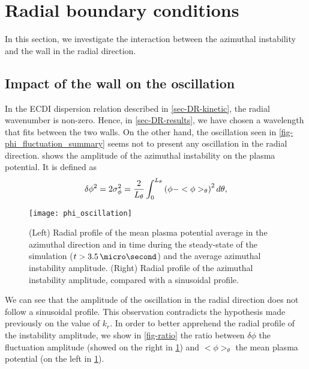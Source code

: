 
\section{Radial boundary conditions}
  \label{sec-DR-BC}
  
  In this section, we investigate the interaction between the azimuthal instability and the wall in the radial direction.
  
  \subsection{Impact of the wall on the oscillation}
  \label{subsec-kr}
  
  In the \ac{ECDI} dispersion relation described in \cref{sec-DR-kinetic}, the radial wavenumber is non-zero.
  Hence, in \cref{sec-DR-results}, we have chosen a wavelength that fits between the two walls.
  On the other hand, the oscillation seen in \cref{fig-phi_fluctuation_summary} seems not to present any oscillation in the radial direction.
   shows the amplitude of the azimuthal instability on the plasma potential.
  It is defined as
  \begin{equation} \label{eq-stdphi}
    \delta \phi^2 = 2 \sigma_{\phi}^2 = \frac{{2}}{L_{\theta}} \int_0^{L_{\theta}} \left(  \phi - <\phi>_{\theta}  \right) ^2 d\theta,
  \end{equation}
  
  \begin{figure}[hbtp]
    \centering
    \texttt{[image: phi\_oscillation]}
    \caption{(Left) Radial profile of the mean plasma potential average in the azimuthal direction  and in time during the steady-state of the simulation ($t > 3.5 \,\micro\second$) and the average azimuthal instability amplitude. (Right) Radial profile of the  azimuthal instability amplitude, compared with a sinusoidal profile. }
    \label{fig-phi_osci_profile}
  \end{figure}
  
  
  We can see that the amplitude of the oscillation in the radial direction does not follow a sinusoidal profile.
  This observation contradicts the hypothesis made previously on the value of $k_r$.
  In order to better apprehend the radial profile of the instability amplitude, we show in \cref{fig-ratio} the ratio between $\delta \phi$ the fluctuation amplitude (showed on the right in \cref{fig-phi_osci_profile}) and $<\phi>_{\theta}$  the mean plasma potential (on the left in \cref{fig-phi_osci_profile}).
  
